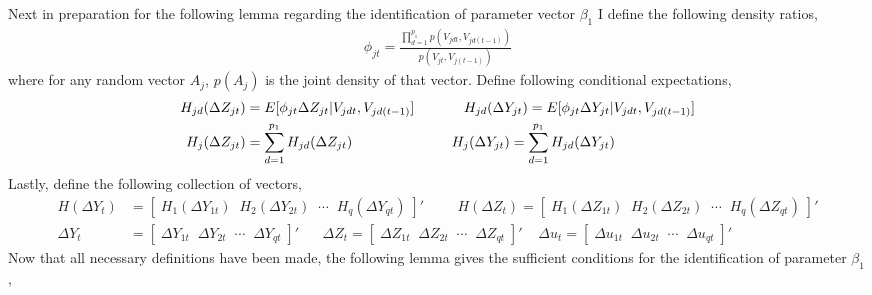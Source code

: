 \documentclass[10pt]{article}
\begin{document}
\noindent Next in preparation for the following lemma regarding the identification of parameter vector $\beta_1$ I define the following density ratios,
\begin{align*}
\phi_{jt} = \frac{ \prod_{d=1}^{p_1}p(V_{jdt},V_{jd(t-1)}) }{p(V_{jt},V_{j(t-1)})}
\end{align*}
where for any random vector $A_{j}$, $p(A_{j})$ is the joint density of that vector. Define following conditional expectations,
\begin{align*}
H_{jd}(\Delta Z_{jt}) &= E[\phi_{jt} \Delta Z_{jt} |V_{jdt},V_{jd(t-1)}] \hspace{1.25cm}
%
H_{jd}(\Delta Y_{jt}) = E[\phi_{jt} \Delta Y_{jt} |V_{jdt},V_{jd(t-1)}] \\
%
H_j(\Delta Z_{jt}) &= \sum_{d=1}^{p_1} H_{jd}(\Delta Z_{jt})  \hspace{2.5cm}
%
H_j(\Delta Y_{jt}) = \sum_{d=1}^{p_1} H_{jd}(\Delta Y_{jt})  \end{align*}
Lastly, define the following collection of vectors,
\begin{align*}
H(\Delta Y_t)  &= [ \; H_1(\Delta Y_{1t}) \;\; H_2(\Delta Y_{2t}) \;\; \cdots \;\; H_q(\Delta Y_{qt}) \; ]'
\hspace{1cm}
H(\Delta Z_t)  = [ \; H_1(\Delta Z_{1t}) \;\; H_2(\Delta Z_{2t}) \;\; \cdots \;\; H_q(\Delta Z_{qt}) \; ]' \\
%
\Delta Y_t &= [ \; \Delta Y_{1t} \;\;  \Delta Y_{2t} \;\; \cdots \;\; \Delta Y_{qt} \;] '  \;\;\;\;\;\; \Delta Z_t = [ \; \Delta Z_{1t} \;\;  \Delta Z_{2t} \;\; \cdots \;\; \Delta Z_{qt} \;] '
\;\;\;\; \Delta u_t =  [ \; \Delta u_{1t} \;\;  \Delta u_{2t} \;\; \cdots \;\; \Delta u_{qt} \;] '
\end{align*}
Now that all necessary definitions have been made, the following lemma gives the sufficient conditions for the identification of parameter $\beta_1$,
\end{document}
